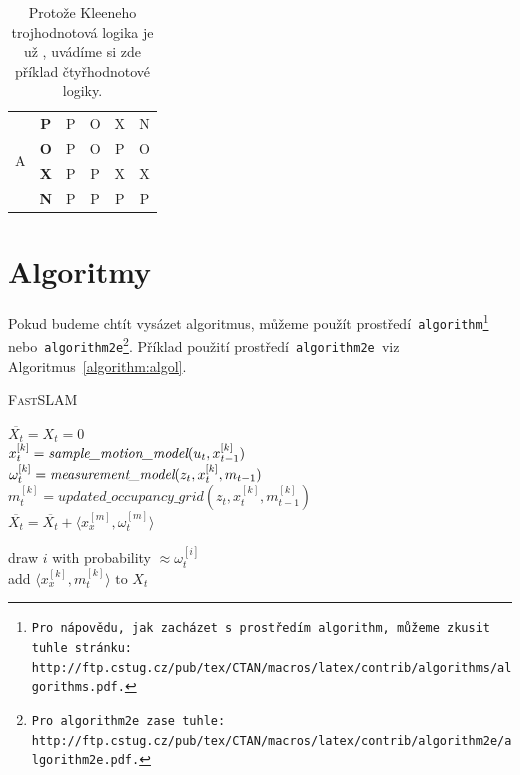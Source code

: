 \documentclass[a4paper,11pt]{article}
\begin{document}
\begin{table}[h]
\begin{tabular}{|c|c|c|c|c|c|}
     \hline
     \multirow{4}{*}{A} & \textbf{P} & P & O & X & N \\
     \cline{2-6}
     \cline{2-6}
     & \textbf{O} & P & O & P & O \\
     \cline{2-6}
     & \textbf{X} & P & P & X & X \\
     \cline{2-6}
     & \textbf{N} & P & P & P & P \\
     \hline
     \end{tabular}
     \hfill
     \caption{Protože Kleeneho trojhodnotová logika je už , uvádíme si zde příklad čtyřhodnotové logiky.}
     \label{table:poxn}
\end{table}

\section{Algoritmy}
\label{section:algoritmus}
Pokud budeme chtít vysázet algoritmus, můžeme použít prostředí\texttt{ algorithm\footnote{
 Pro nápovědu, jak zacházet s~prostředím\texttt{ algorithm,} můžeme zkusit tuhle stránku: \\
http://ftp.cstug.cz/pub/tex/CTAN/macros/latex/contrib/algorithms/algorithms.pdf.
} }
nebo\texttt{ algorithm2e\footnote{
Pro\texttt{ algorithm2e }zase tuhle: http://ftp.cstug.cz/pub/tex/CTAN/macros/latex/contrib/algorithm2e/algorithm2e.pdf.
}}. Příklad použití prostředí\texttt{ algorithm2e }viz Algoritmus~\ref{algorithm:algol}.

\IncMargin{2em}
\begin{algorithm}
		\caption{\textsc{FastSLAM}}
		\label{algorithm:algol}
		\SetNlSkip{0.4em}

		\Indm
		\Indmm
		\Indp\Indpp
		\BlankLine

		$ \overline{X_t} = X_t = 0 $ \\

		{
			$ x_t^{[k]} = \emph{sample\_motion\_model}(u_t, x_{t - 1}^{[k]}) $ \\
			$ \omega_t^{[k]} = \emph{measurement\_model}(z_t, x_t^{[k]}, m_{t - 1}) $ \\
			$ m_t^{[k]} = updated\_occupancy\_grid(z_t, x_t^{[k]}, m_{t - 1}^{[k]}) $ \\
			$ \overline{X_t} = \overline{X_t} + \langle x_x^{[m]}, \omega_t^{[m]}  \rangle $ \\
		}

		{
			draw $ i $ with probability $\approx \omega_t^{[i]} $ \\
			add $ \langle x_x^{[k]}, m_t^{[k]} \rangle \textrm{ to } X_t $ \\
		}
		
\end{algorithm}
\DecMargin{2em}
\end{document}
